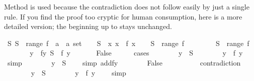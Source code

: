 \begin{isabellebody}
\begin{isamarkuptext}
Method  is used because the contradiction does not follow easily
by just a single rule. If you find the proof too cryptic for human
consumption, here is a more detailed version; the beginning up to
 stays unchanged.%
\end{isamarkuptext}%
\isamarkuptrue%
\ {\isachardoublequote}{\isasymexists}S{\isachardot}\ S\ {\isasymnotin}\ range\ {\isacharparenleft}f\ {\isacharcolon}{\isacharcolon}\ {\isacharprime}a\ {\isasymRightarrow}\ {\isacharprime}a\ set{\isacharparenright}{\isachardoublequote}\isanewline
\isamarkupfalse%
\isanewline
\ \ \isamarkupfalse%
\ {\isacharquery}S\ {\isacharequal}\ {\isachardoublequote}{\isacharbraceleft}x{\isachardot}\ x\ {\isasymnotin}\ f\ x{\isacharbraceright}{\isachardoublequote}\isanewline
\ \ \isamarkupfalse%
\ {\isachardoublequote}{\isacharquery}S\ {\isasymnotin}\ range\ f{\isachardoublequote}\isanewline
\ \ \isamarkupfalse%
\isanewline
\ \ \ \ \isamarkupfalse%
\ {\isachardoublequote}{\isacharquery}S\ {\isasymin}\ range\ f{\isachardoublequote}\isanewline
\ \ \ \ \isamarkupfalse%
\ \isamarkupfalse%
\ y\ \ fy{\isacharcolon}\ {\isachardoublequote}{\isacharquery}S\ {\isacharequal}\ f\ y{\isachardoublequote}\ \isamarkupfalse%
\isacommand{{\isachardot}{\isachardot}}\isanewline
\ \ \ \ \isamarkupfalse%
\ False\isanewline
\ \ \ \ \isamarkupfalse%
\ cases\isanewline
\ \ \ \ \ \ \isamarkupfalse%
\ {\isachardoublequote}y\ {\isasymin}\ {\isacharquery}S{\isachardoublequote}\isanewline
\ \ \ \ \ \ \isamarkupfalse%
\ {\isachardoublequote}y\ {\isasymnotin}\ f\ y{\isachardoublequote}\ \ \ \isamarkupfalse%
\ simp\isanewline
\ \ \ \ \ \ \isamarkupfalse%
\ {\isachardoublequote}y\ {\isasymnotin}\ {\isacharquery}S{\isachardoublequote}\ \ \ \ \isamarkupfalse%
simp\ add{\isacharcolon}fy{\isacharparenright}\isanewline
\ \ \ \ \ \ \isamarkupfalse%
\ False\ \ \ \ \ \ \ \ \ \isamarkupfalse%
\ contradiction\isanewline
\ \ \ \ \isamarkupfalse%
\isanewline
\ \ \ \ \ \ \isamarkupfalse%
\ {\isachardoublequote}y\ {\isasymnotin}\ {\isacharquery}S{\isachardoublequote}\isanewline
\ \ \ \ \ \ \isamarkupfalse%
\ {\isachardoublequote}y\ {\isasymin}\ f\ y{\isachardoublequote}\ \ \ \isamarkupfalse%
\ simp\isanewline

\end{isabellebody}
